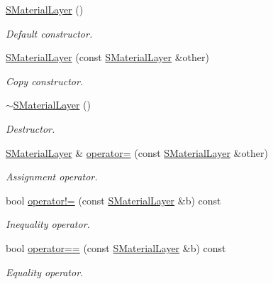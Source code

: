 \begin{DoxyCompactItemize}
\item 
\hyperlink{classirr_1_1video_1_1SMaterialLayer_aa33412579ecf68093eec0926cfddfcda}{S\+Material\+Layer} ()\hypertarget{classirr_1_1video_1_1SMaterialLayer_aa33412579ecf68093eec0926cfddfcda}{}\label{classirr_1_1video_1_1SMaterialLayer_aa33412579ecf68093eec0926cfddfcda}

\begin{DoxyCompactList}\small\item\em Default constructor. \end{DoxyCompactList}\item 
\hyperlink{classirr_1_1video_1_1SMaterialLayer_afb8b8d94178e389f8afa1e6190a35f9d}{S\+Material\+Layer} (const \hyperlink{classirr_1_1video_1_1SMaterialLayer}{S\+Material\+Layer} \&other)
\begin{DoxyCompactList}\small\item\em Copy constructor. \end{DoxyCompactList}\item 
\hyperlink{classirr_1_1video_1_1SMaterialLayer_a3a95dd1993dcc1f2d4bf873602b49b4e}{$\sim$\+S\+Material\+Layer} ()\hypertarget{classirr_1_1video_1_1SMaterialLayer_a3a95dd1993dcc1f2d4bf873602b49b4e}{}\label{classirr_1_1video_1_1SMaterialLayer_a3a95dd1993dcc1f2d4bf873602b49b4e}

\begin{DoxyCompactList}\small\item\em Destructor. \end{DoxyCompactList}\item 
\hyperlink{classirr_1_1video_1_1SMaterialLayer}{S\+Material\+Layer} \& \hyperlink{classirr_1_1video_1_1SMaterialLayer_a94f5f3af3cd4ded545779e1942c63734}{operator=} (const \hyperlink{classirr_1_1video_1_1SMaterialLayer}{S\+Material\+Layer} \&other)
\begin{DoxyCompactList}\small\item\em Assignment operator. \end{DoxyCompactList}\item 
bool \hyperlink{classirr_1_1video_1_1SMaterialLayer_a400cc9efd2910b66dcdc57cbb244ce92}{operator!=} (const \hyperlink{classirr_1_1video_1_1SMaterialLayer}{S\+Material\+Layer} \&b) const 
\begin{DoxyCompactList}\small\item\em Inequality operator. \end{DoxyCompactList}\item 
bool \hyperlink{classirr_1_1video_1_1SMaterialLayer_ac35ecbecf111244de7b91626d935494d}{operator==} (const \hyperlink{classirr_1_1video_1_1SMaterialLayer}{S\+Material\+Layer} \&b) const 
\begin{DoxyCompactList}\small\item\em Equality operator. \end{DoxyCompactList}\end{DoxyCompactItemize}
